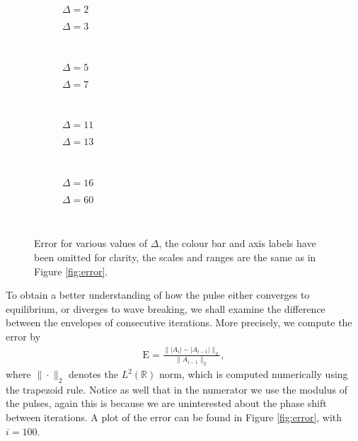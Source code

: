 \begin{figure}[p]
\begin{subfigure}{0.5\textwidth}

\caption{$\Delta = 2$}
\end{subfigure}
\begin{subfigure}{0.5\textwidth}

\caption{$\Delta = 3$}
\end{subfigure} \\
\begin{subfigure}{0.5\textwidth}

\caption{$\Delta = 5$}
\end{subfigure}
\begin{subfigure}{0.5\textwidth}

\caption{$\Delta = 7$}
\end{subfigure} \\
\begin{subfigure}{0.5\textwidth}

\caption{$\Delta = 11$}
\end{subfigure}
\begin{subfigure}{0.5\textwidth}

\caption{$\Delta = 13$}
\end{subfigure} \\
\begin{subfigure}{0.5\textwidth}

\caption{$\Delta = 16$}
\end{subfigure}
\begin{subfigure}{0.5\textwidth}

\caption{$\Delta = 60$}
\end{subfigure} \\
\caption[Error for various values of $\Delta$.]{Error for various values of $\Delta$, the colour bar and axis labels have been omitted for clarity, the scales and ranges are the same as in Figure \ref{fig:error}.}
\label{fig:deltaerror}
\end{figure}

To obtain a better understanding of how the pulse either converges to equilibrium, or diverges to wave breaking, we shall examine the difference between the envelopes of consecutive iterations. More precisely, we compute the error by
\begin{align}
\textrm{E} = \frac{\| |A_i| - |A_{i-1}| \|_2}{\| A_{i-1} \|_2},
\label{eq:error}
\end{align}
where $\| \cdot \|_2$ denotes the $L^2(\mathbb{R})$ norm, which is computed numerically using the trapezoid rule. Notice as well that in the numerator we use the modulus of the pulses, again this is because we are uninterested about the phase shift between iterations. A plot of the error can be found in Figure \ref{fig:error}, with $i = 100$. \\

